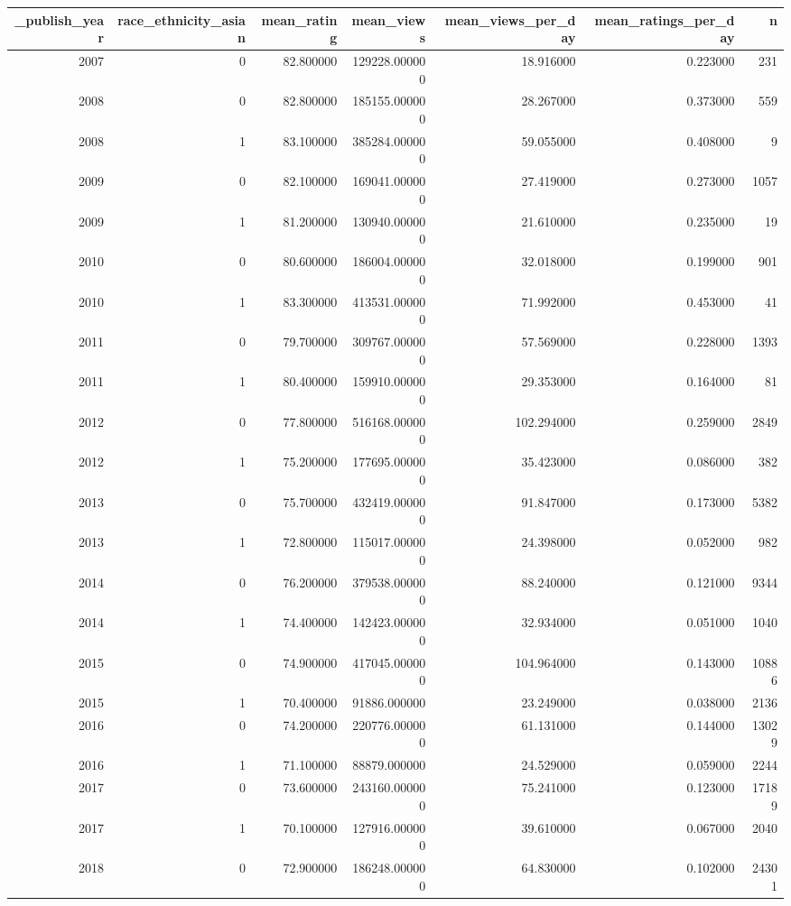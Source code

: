 \begin{tabular}{rrrrrrr}
\toprule
_publish_year & race_ethnicity_asian & mean_rating & mean_views & mean_views_per_day & mean_ratings_per_day & n \\
\midrule
2007 & 0 & 82.800000 & 129228.000000 & 18.916000 & 0.223000 & 231 \\
2008 & 0 & 82.800000 & 185155.000000 & 28.267000 & 0.373000 & 559 \\
2008 & 1 & 83.100000 & 385284.000000 & 59.055000 & 0.408000 & 9 \\
2009 & 0 & 82.100000 & 169041.000000 & 27.419000 & 0.273000 & 1057 \\
2009 & 1 & 81.200000 & 130940.000000 & 21.610000 & 0.235000 & 19 \\
2010 & 0 & 80.600000 & 186004.000000 & 32.018000 & 0.199000 & 901 \\
2010 & 1 & 83.300000 & 413531.000000 & 71.992000 & 0.453000 & 41 \\
2011 & 0 & 79.700000 & 309767.000000 & 57.569000 & 0.228000 & 1393 \\
2011 & 1 & 80.400000 & 159910.000000 & 29.353000 & 0.164000 & 81 \\
2012 & 0 & 77.800000 & 516168.000000 & 102.294000 & 0.259000 & 2849 \\
2012 & 1 & 75.200000 & 177695.000000 & 35.423000 & 0.086000 & 382 \\
2013 & 0 & 75.700000 & 432419.000000 & 91.847000 & 0.173000 & 5382 \\
2013 & 1 & 72.800000 & 115017.000000 & 24.398000 & 0.052000 & 982 \\
2014 & 0 & 76.200000 & 379538.000000 & 88.240000 & 0.121000 & 9344 \\
2014 & 1 & 74.400000 & 142423.000000 & 32.934000 & 0.051000 & 1040 \\
2015 & 0 & 74.900000 & 417045.000000 & 104.964000 & 0.143000 & 10886 \\
2015 & 1 & 70.400000 & 91886.000000 & 23.249000 & 0.038000 & 2136 \\
2016 & 0 & 74.200000 & 220776.000000 & 61.131000 & 0.144000 & 13029 \\
2016 & 1 & 71.100000 & 88879.000000 & 24.529000 & 0.059000 & 2244 \\
2017 & 0 & 73.600000 & 243160.000000 & 75.241000 & 0.123000 & 17189 \\
2017 & 1 & 70.100000 & 127916.000000 & 39.610000 & 0.067000 & 2040 \\
2018 & 0 & 72.900000 & 186248.000000 & 64.830000 & 0.102000 & 24301 \\

\end{tabular}
